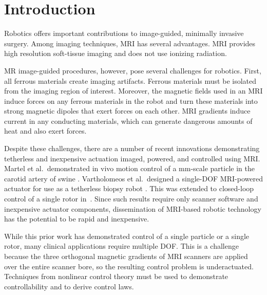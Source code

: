 \section{Introduction}\label{sec:Intro}

Robotics offers important contributions to image-guided, minimally invasive surgery.  
Among imaging techniques,  MRI has several advantages.  MRI provides high resolution soft-tissue imaging and does not use ionizing radiation. 
%


 MR image-guided procedures, however, pose several challenges for robotics\cite{Ho2012TRO,fischer2008mri,Martel2007,Vartholomeos2011,Vartholomeos2013}.  First, all ferrous materials create imaging artifacts.  Ferrous materials must be isolated from the imaging region of interest.  Moreover, the magnetic fields used in an MRI induce forces on any ferrous materials in the robot and turn these materials into strong magnetic dipoles that exert forces on each other.   MRI gradients induce current in any conducting materials, which can generate dangerous amounts of heat and also exert forces. 
 
Despite these challenges, there are a number of recent innovations demonstrating tetherless and inexpensive actuation imaged, powered, and controlled using MRI.   Martel et al.\ demonstrated in vivo motion control of a mm-scale particle in the carotid artery of swine \cite{Martel2007}. Vartholomeos et al.~designed a single-DOF MRI-powered actuator for use as a tetherless biopsy robot \cite{Vartholomeos2011}.  This was extended to closed-loop control of a single rotor in~\cite{Vartholomeos2013}. Since such results require only scanner software and inexpensive actuator components, dissemination of MRI-based robotic technology has the potential to be rapid and inexpensive.

While this prior work has demonstrated control of a single particle or a single rotor, many clinical applications require multiple DOF. This is a challenge because the three orthogonal magnetic gradients of MRI scanners are applied over the entire scanner bore, so the resulting control problem is underactuated. Techniques from nonlinear control theory must be used to demonstrate controllability and to derive control laws.

